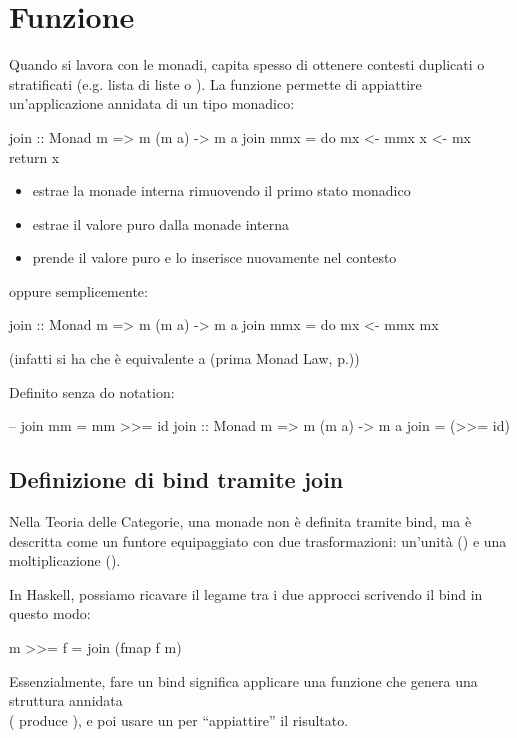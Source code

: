 \section{Funzione }
Quando si lavora con le monadi, capita spesso di ottenere contesti duplicati o stratificati (e.g. lista di liste o ). La funzione  permette di appiattire un'applicazione annidata di un tipo monadico:
\begin{haskellbox}{}
join :: Monad m => m (m a) -> m a
join mmx = do
  mx <- mmx
  x  <- mx
  return x
\end{haskellbox}
\begin{itemize}
    \item {} estrae la monade interna  rimuovendo il primo stato monadico
    \item {} estrae il valore puro dalla monade interna
    \item {} prende il valore puro e lo inserisce nuovamente nel contesto
\end{itemize}

oppure semplicemente:
\begin{haskellbox}{}
join :: Monad m => m (m a) -> m a
join mmx = do
  mx <- mmx
  mx
\end{haskellbox}
(infatti si ha che  è equivalente a  (prima Monad Law, p.\pageref{monad_laws}))

Definito senza do notation:
\begin{haskellbox}{}
-- join mm = mm >>= id
join :: Monad m => m (m a) -> m a
join = (>>= id)
\end{haskellbox}

\subsection{Definizione di bind tramite join}
    Nella Teoria delle Categorie, una monade non è definita tramite bind, ma è descritta come un funtore equipaggiato con due trasformazioni: un'unità () e una moltiplicazione (). 

In Haskell, possiamo ricavare il legame tra i due approcci scrivendo il bind in questo modo:
\begin{haskellbox}{}
m >>= f = join (fmap f m)
\end{haskellbox}

Essenzialmente, fare un bind significa applicare una funzione che genera una struttura annidata \\
( produce ), e poi usare un  per ``appiattire'' il risultato.


